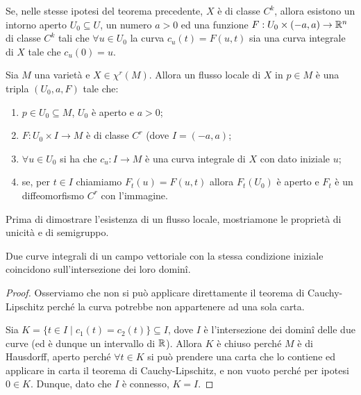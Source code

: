  \begin{theorem}
  Se, nelle stesse ipotesi del teorema precedente, $X$ è di classe $C^k$, allora
  esistono un intorno aperto $U_0\subseteq U$, un numero $a>0$ ed una funzione
  $F:U_0\times (-a,a)\to\mathbb R^n$ di classe $C^k$ tali che $\forall u\in U_0$ la curva $c_u(t)=F(u,t)$
  sia una curva integrale di $X$ tale che $c_u(0)=u$.
 \end{theorem}

 \begin{definition}
  Sia $M$ una varietà e $X\in\chi^r(M)$. Allora un flusso locale di $X$ in $p\in M$ è
  una tripla $(U_0,a,F)$ tale che:
  \begin{enumerate}[label=\bf\Roman*)]
   \item $p\in U_0\subseteq M$, $U_0$ è aperto e $a>0$;
   \item $F:U_0\times I\to M$ è di classe $C^r$ (dove $I=(-a,a)$;
   \item $\forall u\in U_0$ si ha che $c_u:I\to M$ è una curva integrale di $X$
   con dato iniziale $u$;
   \item se, per $t\in I$ chiamiamo $F_t(u)=F(u,t)$ allora $F_t(U_0)$ è aperto e
   $F_t$ è un diffeomorfismo $C^r$ con l'immagine.
  \end{enumerate}
 \end{definition}

 Prima di dimostrare l'esistenza di un flusso locale, mostriamone le proprietà di
 unicità e di semigruppo.
 
 \begin{proposition}
  Due curve integrali di un campo vettoriale con la stessa condizione iniziale
  coincidono sull'intersezione dei loro dominî.
 \end{proposition}

 \begin{proof}
  Osserviamo che non si può applicare direttamente il teorema di Cauchy-Lipschitz
  perché la curva potrebbe non appartenere ad una sola carta.
  
  Sia $K=\{ t\in I\;|\; c_1(t)=c_2(t)\}\subseteq I$, dove $I$ è l'intersezione dei
  dominî delle due curve (ed è dunque un intervallo di $\mathbb R$). Allora $K$ è chiuso perché $M$ è di
  Hausdorff, aperto perché $\forall t\in K$ si può prendere una carta che lo contiene
  ed applicare in carta il teorema di Cauchy-Lipschitz, e non vuoto perché per ipotesi
  $0\in K$. Dunque, dato che $I$ è connesso, $K=I$.
 \end{proof}

